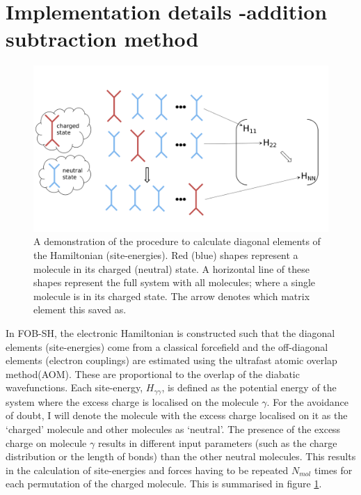 \section{Implementation details -addition subtraction method}
\label{sect:addSubMethod}
\begin{figure}[ht]
  \includegraphics[width=\textwidth]{../img/ES/ForceEnerCalc.png}
  \caption{\label{fig:FE_Calc}A demonstration of the procedure to calculate diagonal elements of the Hamiltonian (site-energies). Red (blue) shapes represent a molecule in its charged (neutral) state. A  horizontal line of these shapes represent the full system with all molecules; where a single molecule is in its charged state. The arrow denotes which matrix element this saved as.}
\end{figure}
\noindent In FOB-SH, the electronic Hamiltonian is constructed such that the diagonal elements (site-energies) come from a classical forcefield and the off-diagonal elements (electron couplings) are estimated using the ultrafast atomic overlap method(AOM). These are proportional to the overlap of the diabatic wavefunctions. Each site-energy, $H_{\gamma \gamma}$, is defined as the potential energy of the system where the excess charge is localised on the molecule $\gamma$. For the avoidance of doubt, I will denote the molecule with the excess charge localised on it as the `charged' molecule and other molecules as `neutral'. The presence of the excess charge on molecule $\gamma$ results in different input parameters (such as the charge distribution or the length of bonds) than the other neutral molecules. This results in the calculation of site-energies and forces having to be repeated $N_{mol}$ times for each permutation of the charged molecule. This is summarised in figure \ref{fig:FE_Calc}. 
\\\\
